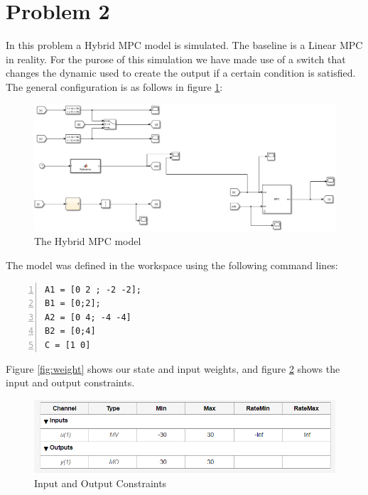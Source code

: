 \documentclass{article}
\begin{document}
\FloatBarrier
\section{Problem 2}
In this problem a Hybrid MPC model is simulated. The baseline is a Linear MPC in reality. For the purose of this simulation we have made use of a switch that changes the dynamic used to create the output if a certain condition is satisfied. The general configuration is as follows in figure \ref{fig:HybridConfig}:

\begin{figure}[htbp]
    \centering
    \includegraphics[width=\linewidth]{images/HybridMPC.png}
    \caption{The Hybrid MPC model}
    \label{fig:HybridConfig}
\end{figure}

The model was defined in the workspace using the following command lines:
\begin{lstlisting}[frame=single,numbers=left,style=Matlab-Pyglike]
A1 = [0 2 ; -2 -2];
B1 = [0;2];
A2 = [0 4; -4 -4]
B2 = [0;4]
C = [1 0]
\end{lstlisting}

Figure \ref{fig:weight} shows our state and input weights, and figure \ref{fig:Constraints} shows the input and output constraints.

\begin{figure}[htbp]
    \centering
    \includegraphics[width=\linewidth]{images/Constraints.png}
    \caption{Input and Output Constraints}
    \label{fig:Constraints}
\end{figure}
\end{document}

